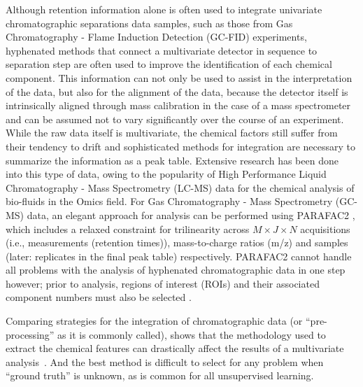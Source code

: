 \documentclass[preprint,12pt]{elsarticle}
\begin{document}
Although retention information alone is often used to integrate univariate chromatographic separations data samples, such as those from Gas Chromatography - Flame Induction Detection (GC-FID) experiments, hyphenated methods that connect a multivariate detector in sequence to separation step are often used to improve the identification of each chemical component. This information can not only be used to assist in the interpretation of the data, but also for the alignment of the data, because the detector itself is intrinsically aligned through mass calibration in the case of a mass spectrometer and can be assumed not to vary significantly over the course of an experiment. While the raw data itself is multivariate, the chemical factors still suffer from their tendency to drift and sophisticated methods for integration are necessary to summarize the information as a peak table. Extensive research has been done into this type of data, owing to the popularity of High Performance Liquid Chromatography - Mass Spectrometry (LC-MS) data for the chemical analysis of bio-fluids in the Omics field. For Gas Chromatography - Mass Spectrometry (GC-MS) data, an elegant approach for analysis can be performed using PARAFAC2 \cite{kiers1999parafac2}, which includes a relaxed constraint for trilinearity across $M \times J \times N$ acquisitions (i.e., measurements (retention times)), mass-to-charge ratios (m/z) and samples (later: replicates in the final peak table) respectively. PARAFAC2 cannot handle all problems with the analysis of hyphenated chromatographic data in one step however; prior to analysis, regions of interest (ROIs) and their associated component numbers must also be selected \cite{baccolo2021untargeted,giebelhaus2022untargeted}.

Comparing strategies for the integration of chromatographic data (or ``pre-processing'' as it is commonly called), shows that the methodology used to extract the chemical features can drastically affect the results of a multivariate analysis~\cite{weggler2021unique}. And the best method is difficult to select for any problem when ``ground truth'' is unknown, as is common for all unsupervised learning.


\end{document}

